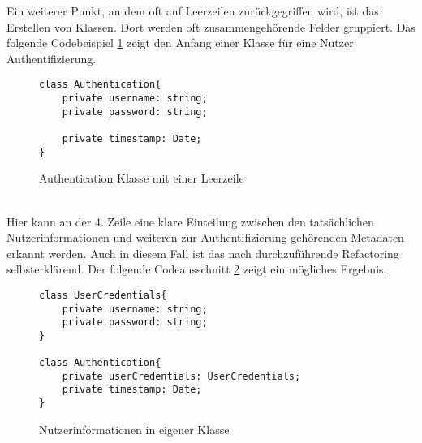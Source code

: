 \newpage
Ein weiterer Punkt, an dem oft auf Leerzeilen zurückgegriffen wird, ist das Erstellen von Klassen.
Dort werden oft zusammengehörende Felder gruppiert.
Das folgende Codebeispiel \ref{fig:LeerzeileFelder} zeigt den Anfang einer Klasse für eine Nutzer Authentifizierung. 
\begin{figure}[ht]
    \centering
        \begin{verbatim}
class Authentication{
    private username: string;
    private password: string;

    private timestamp: Date;
}
        \end{verbatim}
    \caption{Authentication Klasse mit einer Leerzeile}
    \label{fig:LeerzeileFelder}
\end{figure}\\
Hier kann an der 4. Zeile eine klare Einteilung zwischen den tatsächlichen Nutzerinformationen und weiteren zur Authentifizierung gehörenden Metadaten erkannt werden.
Auch in diesem Fall ist das nach \citep[S. 326]{fiveLines.2023} durchzuführende Refactoring selbsterklärend.
Der folgende Codeausschnitt \ref{fig:LeerzeileFelderErgebnis} zeigt ein mögliches Ergebnis.
\begin{figure}[ht]
    \centering
        \begin{verbatim}
class UserCredentials{
    private username: string;
    private password: string;
}

class Authentication{
    private userCredentials: UserCredentials;
    private timestamp: Date;
}
        \end{verbatim}
    \caption{Nutzerinformationen in eigener Klasse}
    \label{fig:LeerzeileFelderErgebnis}
\end{figure}\\
\newpage
